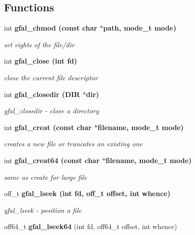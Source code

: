 \subsection*{Functions}
\begin{CompactItemize}
\item 
int \bf{gfal\_\-chmod} (const char $\ast$path, mode\_\-t mode)
\begin{CompactList}\small\item\em set rights of the file/dir \item\end{CompactList}\item 
int \bf{gfal\_\-close} (int fd)
\begin{CompactList}\small\item\em close the current file descriptor \item\end{CompactList}\item 
int \bf{gfal\_\-closedir} (DIR $\ast$dir)
\begin{CompactList}\small\item\em gfal\_\-closedir - close a directory \item\end{CompactList}\item 
int \bf{gfal\_\-creat} (const char $\ast$filename, mode\_\-t mode)
\begin{CompactList}\small\item\em creates a new file or truncates an existing one \item\end{CompactList}\item 
int \bf{gfal\_\-creat64} (const char $\ast$filename, mode\_\-t mode)\label{group__posix__group_g48783e60cafa1a3bf9aa2170b99f9b08}

\begin{CompactList}\small\item\em same as create for large file \item\end{CompactList}\item 
off\_\-t \bf{gfal\_\-lseek} (int fd, off\_\-t offset, int whence)
\begin{CompactList}\small\item\em gfal\_\-lseek - position a file \item\end{CompactList}\item 
off64\_\-t \textbf{gfal\_\-lseek64} (int fd, off64\_\-t offset, int whence)\label{group__posix__group_g39c7d0b6d366fdb0f218439ed3c3bb37}


\end{CompactItemize}
